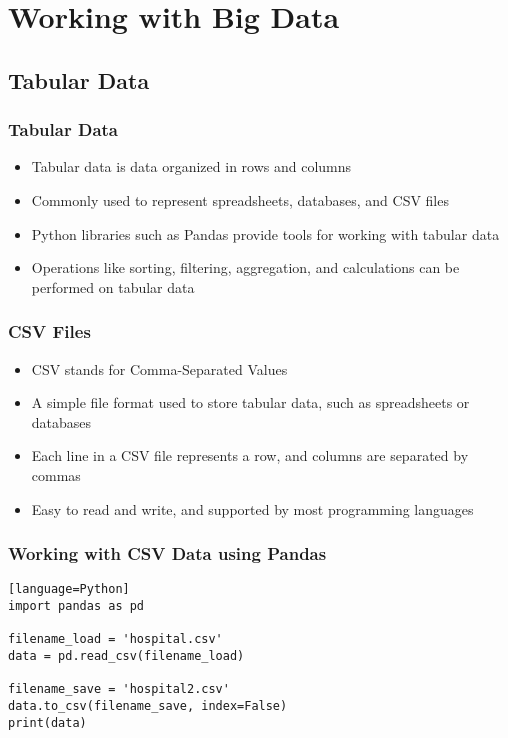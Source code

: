 \documentclass{beamer}
\begin{document}
    \section{Working with Big Data}
    \subsection{Tabular Data}
    \begin{frame}
        \frametitle{Tabular Data}
        \begin{itemize}
            \item Tabular data is data organized in rows and columns
            \item Commonly used to represent spreadsheets, databases, and CSV files
            \item Python libraries such as Pandas provide tools for working with tabular data
            \item Operations like sorting, filtering, aggregation, and calculations can be performed on tabular data
        \end{itemize}
    \end{frame}

    \begin{frame}
        \frametitle{CSV Files}
        \begin{itemize}
            \item CSV stands for Comma-Separated Values
            \item A simple file format used to store tabular data, such as spreadsheets or databases
            \item Each line in a CSV file represents a row, and columns are separated by commas
            \item Easy to read and write, and supported by most programming languages
        \end{itemize}
    \end{frame}

    \begin{frame}[fragile]
        \frametitle{Working with CSV Data using Pandas}
        \begin{lstlisting}[caption=Load a CSV file using Pandas][language=Python]
import pandas as pd

filename_load = 'hospital.csv'
data = pd.read_csv(filename_load)

filename_save = 'hospital2.csv'
data.to_csv(filename_save, index=False)
print(data)
        \end{lstlisting}
    \end{frame}
\end{document}

